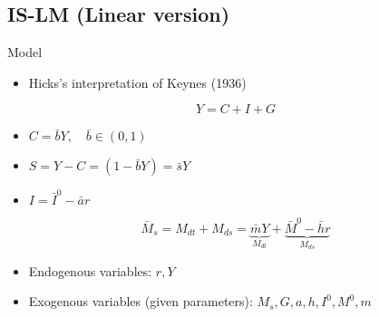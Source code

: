 \documentclass[final]{beamer}
\begin{document}
\subsection{IS-LM (Linear version)} %
\label{sub:is_lm_linear_version}
\begin{frame}[t]{Model}
	\begin{itemize}
		\item Hicks's interpretation of Keynes (1936)
	\end{itemize}
	\[
		Y=C+I+G \tag{IS Schedule: Real side}
	\]
	\begin{itemize}
		\item $C=\bar b Y, \quad \bar b \in (0,1)$
		\item $S=Y-C=(1-\bar b Y)=\bar s Y$
		\item $I=\bar I^0-\bar a r$
	\end{itemize}
	\[
		\bar M_s = M_{dt}+M_{ds} = \underbrace{\bar m Y}_{M_{dt}} + \underbrace{\bar M^0 - \bar h r}_{M_{ds}} \tag{LM Schedule: Monetary side}
	\]
	\begin{itemize}
		\item Endogenous variables: $r,Y$
		\item Exogenous variables (given parameters): $M_s, G, a, h, I^0, M^0, m$
	\end{itemize}
\end{frame}
	
\end{document}
